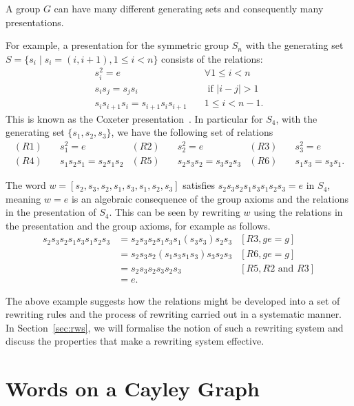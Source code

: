 \documentclass[utf8]{Frontiers_LaTex_Templates/frontiersFPHY} %
\newcommand{\id}{e}
\numberwithin{equation}{section}
\begin{document}
A group $G$ can have many different generating sets and consequently many presentations.  


For example, a presentation for the symmetric group $S_n$ with the generating set $S=\{s_i \mid s_i = (i, i+1), 1 \leq i < n\}$ consists of the relations:
\begin{align*}
s_i^2 = \id & \quad \forall 1 \leq i < n \\
s_i s_j = s_j s_i & \quad \mbox{ if } |i-j| > 1 \\
s_i s_{i+1} s_i = s_{i+1} s_i s_{i+1} & \quad 1 \leq i < n-1.
\end{align*}
This is known as the Coxeter presentation~\citep{humphreys1992reflection}. 
In particular for $S_4$, with the generating set $\{s_1, s_2, s_3\}$, we have the following set of relations
\begin{align*}
(R1) & \quad s_1^2 = \id & (R2) & \quad s_2^2 = \id & (R3) & \quad s_3^2 = \id\\
(R4) & \quad s_1 s_2 s_1 = s_2 s_1 s_2  & (R5) & \quad s_2 s_3 s_2 = s_3 s_2 s_3 
 & (R6) & \quad s_1 s_3 = s_3 s_1. 
\end{align*}

The word $w = [s_2, s_3, s_2, s_1, s_3, s_1, s_2, s_3]$ satisfies  
$s_2 s_3 s_2 s_1 s_3 s_1 s_2 s_3 
=
\id$ in $S_4$, meaning $w 
=
\id$ is an algebraic consequence of the group axioms and the relations in the presentation of $S_4$. This can be seen by rewriting $w$ using the relations in the presentation and the group axioms, for example as follows.
% 
\begin{align*}
s_2 s_3 s_2 s_1 s_3 s_1 s_2 s_3 &= s_2 s_3 s_2 s_1 s_3 s_1 (s_3 s_3) s_2 s_3 & [R3, g\id=g] \\
&= s_2 s_3 s_2 (s_1 s_3 s_1 s_3) s_3 s_2 s_3 & [R6, g\id=g]\\
&= s_2 s_3 s_2 s_3 s_2 s_3 & [R5, R2 \text{ and }R3]\\
&= \id.
\end{align*}

The above example suggests how the relations might be developed into a set of rewriting rules and the process of rewriting carried out in a systematic manner.  
In Section~\ref{sec:rws}, we will formalise the notion of such a rewriting system and discuss the properties that make a rewriting system effective.

\section{Words on a Cayley Graph}\label{sec:cg}
\end{document}
